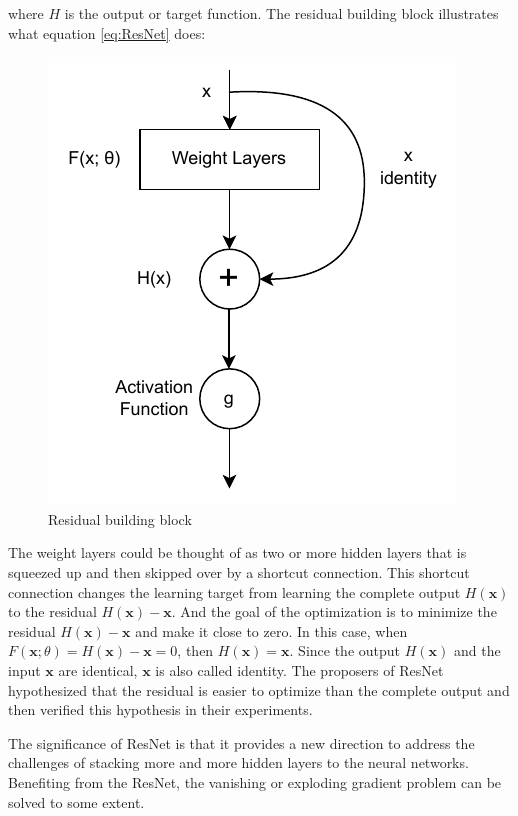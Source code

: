 \documentclass[
	parskip, 			   %
	twoside, 			   %
	DIV=14, 			   %
	BCOR=15.0mm, 		   %
	headsepline, 		   %
	open=right, 		   %
	captions=tableheading, %
	bibliography=totoc,    %
	numbers=noenddot       %
]{scrreprt}
\begin{document}
where $H$ is the output or target function. The residual building block illustrates what equation \ref{eq:ResNet} does:

\clearpage
\begin{figure}[htbp!]
    \centering
    \includegraphics[scale=1]{figures/ResNet.pdf}
    \caption{Residual building block}
    \label{fig:ResNet}
\end{figure}

The weight layers could be thought of as two or more hidden layers that is squeezed up and then skipped over by a shortcut connection. This shortcut connection changes the learning target from learning the complete output $H(\mathbf{x})$ to the residual $H(\mathbf{x})-\mathbf{x}$. And the goal of the optimization is to minimize the residual $H(\mathbf{x})-\mathbf{x}$ and make it close to zero. In this case, when $F(\mathbf{x};\theta)=H(\mathbf{x})-\mathbf{x}=0$, then $H(\mathbf{x})=\mathbf{x}$. Since the output $H(\mathbf{x})$ and the input $\mathbf{x}$ are identical, $\mathbf{x}$ is also called identity. The proposers of ResNet hypothesized that the residual is easier to optimize than the complete output and then verified this hypothesis in their experiments. 

 The significance of ResNet is that it provides a new direction to address the challenges of stacking more and more hidden layers to the neural networks. Benefiting from the ResNet, the vanishing or exploding gradient problem can be solved to some extent.
\end{document}
